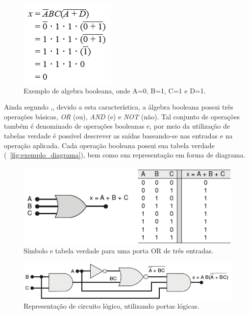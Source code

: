\begin{figure}[!htbp]
	\begin{center}
    \caption{\label{fig:algebra_booleana}Exemplo de algebra booleana, onde A=0, B=1, C=1 e D=1.}
	\includegraphics[scale=0.70]{Figuras/algebra_booleana.png}
	\end{center}
\end{figure}

\par
Ainda segundo \citeauthor{tocci2003sistemas},\citeyear{tocci2003sistemas}, devido a esta característica, a álgebra booleana possui três operações básicas, \textit{OR} (ou), \textit{AND} (e) e \textit{NOT} (não). Tal conjunto de operações também é denominado de operações booleanas e, por meio da utilização de tabelas verdade é possível descrever as saídas baseando-se nas entradas e na operação aplicada. Cada operação booleana possui sua tabela verdade (~\autoref{fig:exemplo_diagrama}), bem como sua representação em forma de diagrama.

\begin{figure}[H]
	\begin{center}
    \caption{\label{fig:exemplo_diagrama}Símbolo e tabela verdade para uma porta OR de três entradas.}
	\includegraphics[scale=0.60]{Figuras/exemplo_diagrama.png}
	\end{center}
\end{figure}

\begin{figure}[H]
	\begin{center}
    \caption{\label{fig:exemplo_circuito} Representação de circuito lógico, utilizando portas lógicas.}
	\includegraphics[scale=0.60]{Figuras/exemplo_circuito.png}
	\end{center}
\end{figure}

